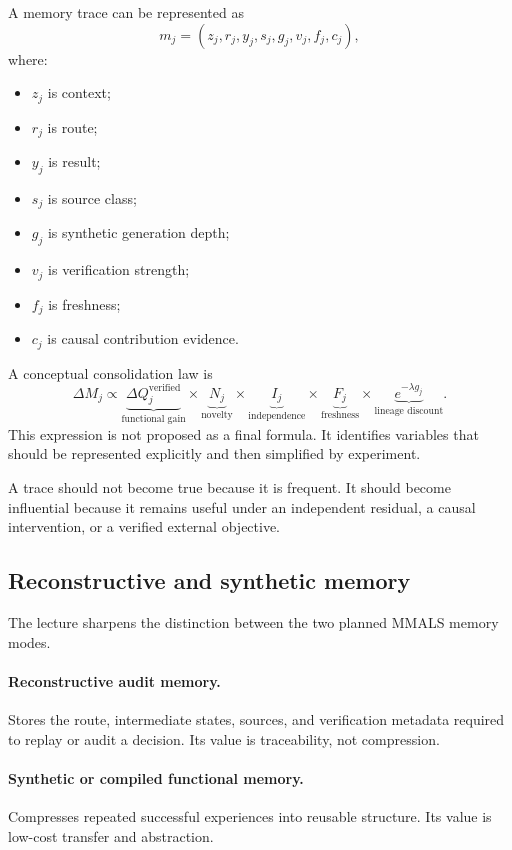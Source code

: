 A memory trace can be represented as
\[
m_j=(z_j,r_j,y_j,s_j,g_j,v_j,f_j,c_j),
\]
where:

\begin{itemize}[leftmargin=*]
  \item $z_j$ is context;
  \item $r_j$ is route;
  \item $y_j$ is result;
  \item $s_j$ is source class;
  \item $g_j$ is synthetic generation depth;
  \item $v_j$ is verification strength;
  \item $f_j$ is freshness;
  \item $c_j$ is causal contribution evidence.
\end{itemize}

A conceptual consolidation law is
\[
\Delta M_j
\propto
\underbrace{\Delta Q_j^{\mathrm{verified}}}_{\text{functional gain}}
\times
\underbrace{N_j}_{\text{novelty}}
\times
\underbrace{I_j}_{\text{independence}}
\times
\underbrace{F_j}_{\text{freshness}}
\times
\underbrace{e^{-\lambda g_j}}_{\text{lineage discount}}.
\]
This expression is not proposed as a final formula. It identifies variables that should be represented explicitly and then simplified by experiment.

\begin{mmalsnote}
A trace should not become true because it is frequent. It should become influential because it remains useful under an independent residual, a causal intervention, or a verified external objective.
\end{mmalsnote}

\subsection{Reconstructive and synthetic memory}

The lecture sharpens the distinction between the two planned MMALS memory modes.

\paragraph{Reconstructive audit memory.} Stores the route, intermediate states, sources, and verification metadata required to replay or audit a decision. Its value is traceability, not compression.

\paragraph{Synthetic or compiled functional memory.} Compresses repeated successful experiences into reusable structure. Its value is low-cost transfer and abstraction.

